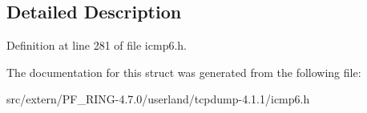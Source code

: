 \subsection{Detailed Description}


Definition at line 281 of file icmp6.h.



The documentation for this struct was generated from the following file:\begin{DoxyCompactItemize}
\item 
src/extern/PF\_\-RING-\/4.7.0/userland/tcpdump-\/4.1.1/icmp6.h\end{DoxyCompactItemize}
